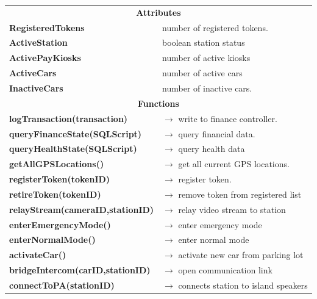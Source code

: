 \documentclass[12pt]{article}
\begin{document}
\begin{table}[H]
\small
\begin{tabularx}{\hsize}{|X|X|}
    \hline
    \rowcolor{nicegreen}
    \multicolumn{2}{|c|}{\textbf{CGC Class}} \\
    \hline
    \hline
    \multicolumn{2}{|c|}{\textbf{Attributes}}      \\
    \hline
    \textbf{RegisteredTokens} & number of registered tokens. \\
    \textbf{ActiveStation} & boolean station status \\
    \textbf{ActivePayKiosks} & number of active kiosks  \\
    \textbf{ActiveCars} &  number of active cars\\
    \textbf{InactiveCars} & number of inactive cars. \\
    \hline
    \multicolumn{2}{|c|}{\textbf{Functions}} \\
    \hline
    \textbf{logTransaction(transaction)} & $\rightarrow$ write to finance controller. \\
    \textbf{queryFinanceState(SQLScript)} & $\rightarrow$ query financial data. \\
    \textbf{queryHealthState(SQLScript)} & $\rightarrow$ query health data \\
    \textbf{getAllGPSLocations()} & $\rightarrow$ get all current GPS locations. \\
    \textbf{registerToken(tokenID) } & $\rightarrow$ register token. \\
    \textbf{retireToken(tokenID)} & $\rightarrow$  remove token from registered list\\
    \textbf{relayStream(cameraID,stationID)} & $\rightarrow$ relay video stream to station\\
    \textbf{enterEmergencyMode()} & $\rightarrow$ enter emergency mode\\
    \textbf{enterNormalMode()} & $\rightarrow$ enter normal mode\\
    \textbf{activateCar()} & $\rightarrow$ activate new car from parking lot\\
    \textbf{bridgeIntercom(carID,stationID)} & $\rightarrow$ open communication link\\
    \textbf{connectToPA(stationID)} & $\rightarrow$ connects station to island speakers\\
    \hline

\end{tabularx}
\end{table}
\end{document}
